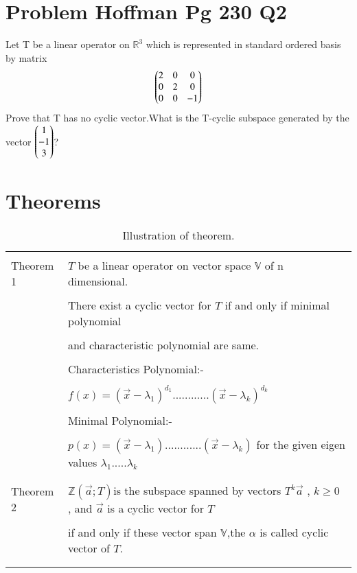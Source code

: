 \documentclass[journal,12pt]{IEEEtran}
\begin{document}
\renewcommand{\thefigure}{\theenumi}
\renewcommand{\thetable}{\theenumi}

\section{\textbf{Problem Hoffman Pg 230 Q2}}
 Let T be a linear operator on $\mathbb{R}^3$ which is represented in standard ordered basis by matrix\\
\begin{align}
    \begin{pmatrix}2&0&0\\0&2&0\\0&0&-1\end{pmatrix}
\end{align}
Prove that T has no cyclic vector.What is the T-cyclic subspace generated by the vector $\begin{pmatrix}1\\-1\\3\end{pmatrix}$?\\ 
\section{\textbf{Theorems}}
\renewcommand{\thetable}{1}
\begin{longtable}{|l|l|}
\hline
\multirow{3}{*}{Theorem 1} & \\
&$T$ be a linear operator on vector space $\mathbb{V}$ of n dimensional.\\
&\\
&There exist a cyclic vector for $T$ if and only if minimal polynomial\\
&\\
&and characteristic polynomial are same.\\
&\\
&Characteristics Polynomial:-\\
&\\
&$f(x)=(\vec{x}-\lambda_1)^{d_1}............(\vec{x}-\lambda_k)^{d_k}$ \\
&\\
&Minimal Polynomial:-\\
&\\
&$p(x)=(\vec{x}-\lambda_1)............(\vec{x}-\lambda_k)$ for the given eigen values $\lambda_1.....\lambda_k$\\
&\\
\hline
\multirow{3}{*}{Theorem 2} & \\
&$\mathbb{Z}(\vec{a};T) $is the subspace spanned by vectors $T^k\vec{a}$ , $k\geq 0$ , and $\vec{a}$ is a cyclic vector for $T$\\
&\\
&if and only if these vector span $\mathbb{V}$,the $\alpha$ is called cyclic vector of $T$.\\ 
&\\
\hline
\caption{Illustration of theorem.}
\label{table:1}
\end{longtable}
\newpage
\end{document}

